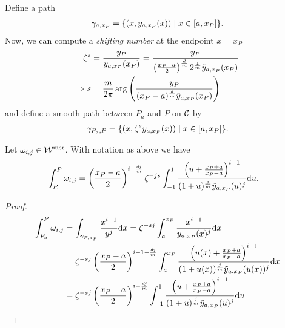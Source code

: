 \documentclass[main.tex]{subfiles}
\begin{document}
  Define a path
  \begin{align*}
   \gamma_{a,x_P} = \{  (x,y_{a,x_P}(x))  \mid  x \in [a,x_P]  \}.
  \end{align*}
  Now, we can compute a \emph{shifting number} at the endpoint $x=x_P$
  \begin{align*}
   \zeta^s & = \frac{y_P}{y_{a,x_P}(x_P)} = \frac{y_P}{\left(\frac{x_P-a}{2}\right)^{\frac{d}{m}} 2^{\frac{1}{m}} \tilde{y}_{a,x_P}(x_P)} \\
   \Rightarrow s & = \frac{m}{2\pi} \arg\left(  \frac{y_P}{ (x_P-a)^{\frac{d}{m}} \tilde{y}_{a,x_P}(x_P)} \right)
  \end{align*}
  and define a smooth path between $P_a$ and $P$ on $\mathcal{C}$ by
  \begin{align*}
   \gamma_{P_a,P} = \{  (x, \zeta^s y_{a,x_P}(x))  \mid  x \in [a,x_P]  \}.
  \end{align*}



  \begin{thm}\label{thm:ajm_finite_int}
  Let $\omega_{i,j} \in \mathcal{W}^{\text{mer}}$. With notation as above we have
 \begin{align}\label{eq:aj_int}
  \begin{split}
       \int_{P_a}^P \omega_{i,j} & = \left(\frac{x_P-a}{2}\right)^{i-\frac{dj}{m}} \zeta^{-js} \int_{-1}^1
      \frac{\left(u + \frac{x_P+a}{x_P-a}\right)^{i-1}}{(1+u)^{\frac{j}{m}} \tilde{y}_{a,x_P}(u)^j}  \mathrm d u.
   \end{split}
   \end{align}
  \end{thm}
  \begin{proof}
    \begin{align}
    \begin{split}
     \int_{P_a}^P \omega_{i,j}  & =  \int_{\gamma_{P,a_P}} \frac{x^{i-1}}{y^j}  \mathrm d x  =  \zeta^{-sj} \int_a^{x_P} \frac{x^{i-1}}{y_{a,x_P}(x)^j}  \mathrm d x \\  & = 
     \zeta^{-sj} \left(\frac{x_P-a}{2}\right)^{i-1-\frac{dj}{m}}
     \int_a^{x_P} \frac{\left(u(x)+\frac{x_P+a}{x_P-a}\right)^{i-1}}{(1+u(x))^{\frac{j}{m}}\tilde{y}_{a,x_P}(u(x))^j}  \mathrm d x \\
     & =  \zeta^{-sj} \left(\frac{x_P-a}{2}\right)^{i-\frac{dj}{m}}
     \int_{-1}^{1} \frac{\left(u+\frac{x_P+a}{x_P-a}\right)^{i-1}}{(1+u)^{\frac{j}{m}}\tilde{y}_{a,x_P}(u)^j}  \mathrm d u \\
    \end{split}
  \end{align}
  \end{proof}
\end{document}
